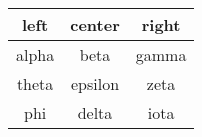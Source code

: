 \documentclass{article}
\begin{document}
\begin{tabular}{|c|c|c|}
\hline
left & center & right \\
\hline
alpha & beta & gamma \\
\hline
theta & epsilon & zeta \\
\hline
phi & delta & iota \\
\hline
\end{tabular}
\end{document}
